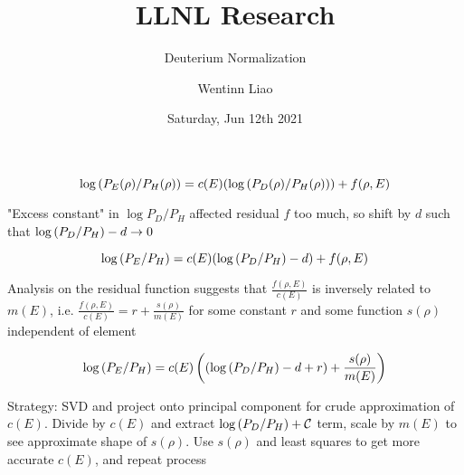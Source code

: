 \documentclass[10pt]{scrartcl}
\title{LLNL Research}
\subtitle{Deuterium Normalization}
\author{Wentinn Liao}
\date{Saturday, Jun 12th 2021}
\begin{document}
	\maketitle
	\[
		\log{\displaystyle\left( P_E(\rho) / P_H(\rho) \right)} = c(E)(\log{\displaystyle\left( P_D(\rho) / P_H(\rho) \right)}) + f(\rho, E)
	\]

	"Excess constant" in $\log{P_D / P_H}$ affected residual $f$ too much, so shift by $d$ such that $\log{\displaystyle\left( P_D / P_H \right)} - d \rightarrow 0$
	
	\[
		\log{\displaystyle\left( P_E / P_H \right)} = c(E)(\log{\displaystyle\left( P_D / P_H \right)} - d) + f(\rho, E)
	\]
	
	Analysis on the residual function suggests that $\frac{f(\rho, E)}{c(E)}$ is inversely related to $m(E)$, i.e. $\frac{f(\rho, E)}{c(E)} = r + \frac{s(\rho)}{m(E)}$ for some constant $r$ and some function $s(\rho)$ independent of element
	
	\[
		\log{\displaystyle\left( P_E / P_H \right)} = c(E)\displaystyle\left( (\log{\displaystyle\left( P_D / P_H \right)} - d + r) + \frac{s(\rho)}{m(E)} \right)
	\]
	
	Strategy: SVD and project onto principal component for crude approximation of $c(E)$. Divide by $c(E)$ and extract $\log{\displaystyle\left( P_D / P_H \right)} + \mathcal{ C }$ term, scale by $m(E)$ to see approximate shape of $s(\rho)$. Use $s(\rho)$ and least squares to get more accurate $c(E)$, and repeat process
\end{document}
